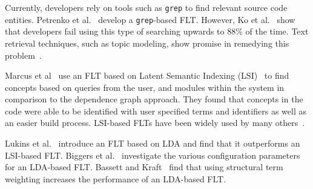 Currently, developers rely on tools such as \texttt{grep} to find relevant
source code entities. Petrenko et al.~\cite{Petrenko-etal:2008} develop
a \texttt{grep}-based FLT. However, Ko et al.~\cite{Ko-etal:2006} show that
developers fail using this type of searching upwards to 88\% of the time.  Text
retrieval techniques, such as topic modeling, show promise in remedying this
problem~\cite{Marcus-etal:2004}.

Marcus et al~\cite{Marcus-etal:2004} use an FLT based on Latent Semantic
Indexing (LSI)~\cite{Deerwester-etal:1990} to find concepts based on queries
from the user, and modules within the system in comparison to the dependence
graph approach. They found that concepts in the code were able to be identified
with user specified terms and identifiers as well as an easier build process.
LSI-based FLTs have been widely used by many others~\cite{ Poshyvanyk-etal:2006,
Poshyvanyk-Marcus:2007, Liu-etal:2007, Scanniello-Marcus:2011, %
Cubranic-etal:2005}.

Lukins et al.~\cite{Lukins-etal:2008} introduce an FLT based on LDA and find
that it outperforms an LSI-based FLT.  Biggers et al.~\cite{Biggers-etal:2014}
investigate the various configuration parameters for an LDA-based FLT.  Bassett
and Kraft~\cite{Bassett-Kraft:2013} find that using structural term weighting
increases the performance of an LDA-based FLT.
